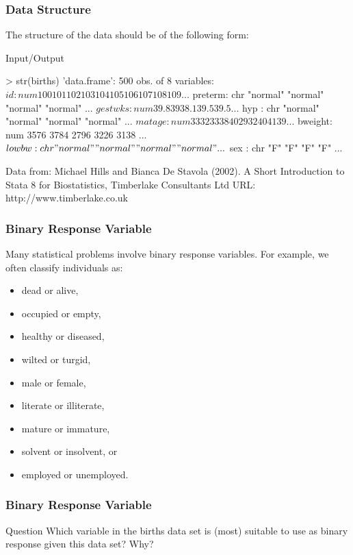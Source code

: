 \begin{frame}[fragile]\frametitle{Data Structure}
The structure of the data should be of the following form:
\footnotesize
\begin{exampleblock}{Input/Output}
\begin{semiverbatim}
    > str(births)
    'data.frame':	500 obs. of  8 variables:
    $ id     : num  100 101 102 103 104 105 106 107 108 109 ...
    $ preterm: chr  "normal" "normal" "normal" "normal" ...
    $ gestwks: num  39.8 39 38.1 39.5 39.5 ...
    $ hyp    : chr  "normal" "normal" "normal" "normal" ...
    $ matage : num  33 32 33 38 40 29 32 40 41 39 ...
    $ bweight: num  3576 3784 2796 3226 3138 ...
    $ lowbw  : chr  "normal" "normal" "normal" "normal" ...
    $ sex    : chr  "F" "F" "F" "F" ...
\end{semiverbatim}
\end{exampleblock}
Data from: Michael Hills and Bianca De Stavola (2002). A Short Introduction
     to Stata 8 for Biostatistics, Timberlake Consultants Ltd URL:
     http://www.timberlake.co.uk
\end{frame}


\begin{frame}\frametitle{Binary Response Variable}
Many statistical problems involve binary response variables. For example, we often classify individuals as:
\begin{itemize}
\item dead or alive,
\item occupied or empty,
\item healthy or diseased,
\item wilted or turgid,
\item male or female,
\item literate or illiterate,
\item mature or immature,
\item solvent or insolvent, or
\item employed or unemployed.
\end{itemize}
\end{frame}

\begin{frame}\frametitle{Binary Response Variable}
\begin{block}{Question}
Which variable in the births data set is (most) suitable to use as binary response given this data set? Why?
\end{block}
\end{frame}


